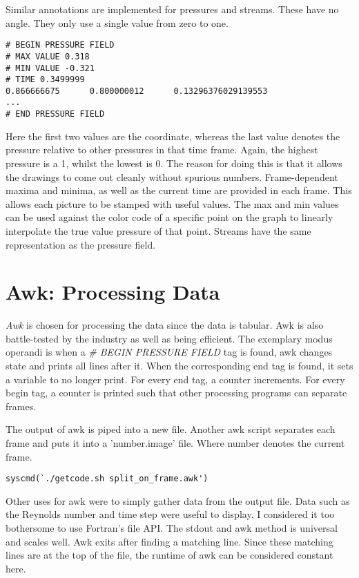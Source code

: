 \documentclass[listof=totoc]{report}
\begin{document}
Similar annotations are implemented for pressures and streams. These have no angle. They only use a single value from zero to one.

\begin{verbatim}
# BEGIN PRESSURE FIELD
# MAX VALUE 0.318
# MIN VALUE -0.321
# TIME 0.3499999
0.866666675      0.800000012      0.13296376029139553
...
# END PRESSURE FIELD
\end{verbatim}

Here the first two values are the coordinate, whereas the last value denotes the pressure relative to other pressures in that time frame. Again, the highest pressure is a 1, whilst the lowest is 0. The reason for doing this is that it allows the drawings to come out cleanly without spurious numbers. Frame-dependent maxima and minima, as well as the current time are provided in each frame. This allows each picture to be stamped with useful values. The max and min values can be used against the color code of a specific point on the graph to linearly interpolate the true value pressure of that point. Streams have the same representation as the pressure field.

\section{Awk: Processing Data}
\emph{Awk} is chosen for processing the data since the data is tabular. Awk is also battle-tested by the industry as well as being efficient.
The exemplary modus operandi is when a \emph{\# BEGIN PRESSURE FIELD} tag is found, awk changes state and prints all lines after it. When the corresponding end tag is found, it sets a variable to no longer print. For every end tag, a counter increments. For every begin tag, a counter is printed such that other processing programs can separate frames.

The output of awk is piped into a new file. Another awk script separates each frame and puts it into a 'number.image' file. Where number denotes the current frame.

\begin{verbatim}
syscmd(`./getcode.sh split_on_frame.awk')
\end{verbatim}

Other uses for awk were to simply gather data from the output file. Data such as the Reynolds number and time step were useful to display. I considered it too bothersome to use Fortran's file API. The stdout and awk method is universal and scales well. Awk exits after finding a matching line. Since these matching lines are at the top of the file, the runtime of awk can be considered constant here.
\end{document}
